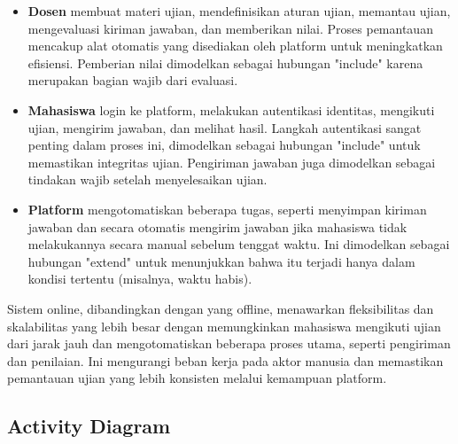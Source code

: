 \begin{itemize}
	\item \textbf{Dosen} membuat materi ujian, mendefinisikan aturan ujian, memantau ujian, mengevaluasi kiriman jawaban, dan memberikan nilai. Proses pemantauan mencakup alat otomatis yang disediakan oleh platform untuk meningkatkan efisiensi. Pemberian nilai dimodelkan sebagai hubungan "include" karena merupakan bagian wajib dari evaluasi.
	\item \textbf{Mahasiswa} login ke platform, melakukan autentikasi identitas, mengikuti ujian, mengirim jawaban, dan melihat hasil. Langkah autentikasi sangat penting dalam proses ini, dimodelkan sebagai hubungan "include" untuk memastikan integritas ujian. Pengiriman jawaban juga dimodelkan sebagai tindakan wajib setelah menyelesaikan ujian.
	\item \textbf{Platform} mengotomatiskan beberapa tugas, seperti menyimpan kiriman jawaban dan secara otomatis mengirim jawaban jika mahasiswa tidak melakukannya secara manual sebelum tenggat waktu. Ini dimodelkan sebagai hubungan "extend" untuk menunjukkan bahwa itu terjadi hanya dalam kondisi tertentu (misalnya, waktu habis).
\end{itemize}

Sistem online, dibandingkan dengan yang offline, menawarkan fleksibilitas dan skalabilitas yang lebih besar dengan memungkinkan mahasiswa mengikuti ujian dari jarak jauh dan mengotomatiskan beberapa proses utama, seperti pengiriman dan penilaian. Ini mengurangi beban kerja pada aktor manusia dan memastikan pemantauan ujian yang lebih konsisten melalui kemampuan platform.


\subsection{Activity Diagram}

